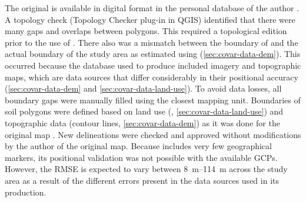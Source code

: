 
The original \soilNew{} is available in digital format in the personal database of the author 
\cite{Miguel2010}. A topology check (Topology Checker plug-in in QGIS) identified that there were many gaps 
and overlaps between polygons. This required a topological edition prior to the use of \soilNew{}. There also 
was a mismatch between the boundary of \soilNew{} and the actual boundary of the study area as estimated using 
\demNew{} (\autoref{sec:covar-data-dem}). This occurred because the database used to produce \soilNew{} 
included \googleearth{} imagery and topographic maps, which are data sources that differ considerably in their 
positional accuracy (\autoref{sec:covar-data-dem} and \autoref{sec:covar-data-land-use}). To avoid data 
losses, 
all boundary gaps were manually filled using the closest mapping unit. Boundaries of soil polygons were 
defined 
based on land use (\landNew{}, \autoref{sec:covar-data-land-use}) and topographic data (contour lines, 
\autoref{sec:covar-data-dem}) as it was done for the original map \cite{Miguel2010}. New delineations were 
checked and approved without modifications by the author of the original map. Because \soilNew{} includes very 
few geographical markers, its positional validation was not possible with the available GCPs. However, the 
RMSE 
is expected to vary between \SIrange{8}{114}{\m} across the study area as a result of the different errors 
present in the data sources used in its production.

